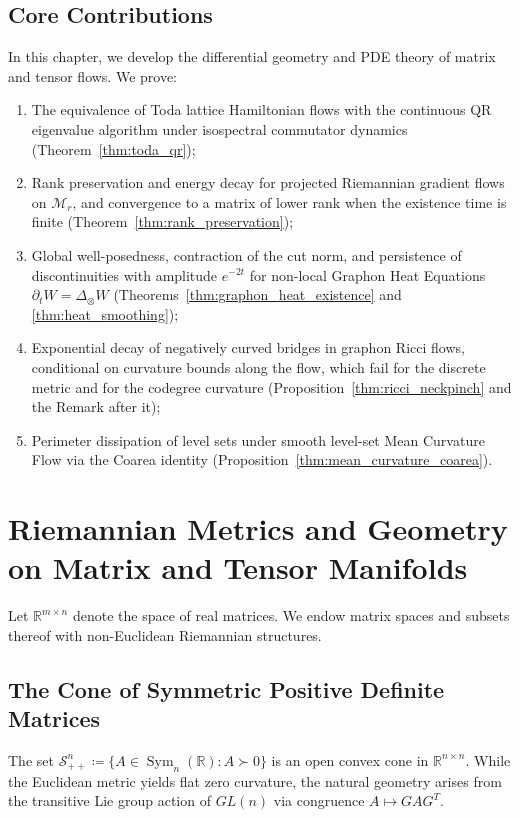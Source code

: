 \documentclass[11pt,a4paper,reqno]{amsart}
\theoremstyle{definition}
\numberwithin{equation}{section}
\providecommand{\R}{\mathbb{R}}
\providecommand{\R}{\mathbb{R}}
\begin{document}
\subsection*{Core Contributions}
In this chapter, we develop the differential geometry and PDE theory of matrix and tensor flows. We prove:
\begin{enumerate}[label=\arabic*.]
    \item The equivalence of Toda lattice Hamiltonian flows with the continuous QR eigenvalue algorithm under isospectral commutator dynamics (Theorem~\ref{thm:toda_qr});
    \item Rank preservation and energy decay for projected Riemannian gradient flows on $\mathcal{M}_r$, and convergence to a matrix of lower rank when the existence time is finite (Theorem~\ref{thm:rank_preservation});
    \item Global well-posedness, contraction of the cut norm, and persistence of discontinuities with amplitude $e^{-2t}$ for non-local Graphon Heat Equations $\partial_t W = \Delta_\otimes W$ (Theorems~\ref{thm:graphon_heat_existence} and \ref{thm:heat_smoothing});
    \item Exponential decay of negatively curved bridges in graphon Ricci flows, conditional on curvature bounds along the flow, which fail for the discrete metric and for the codegree curvature (Proposition~\ref{thm:ricci_neckpinch} and the Remark after it);
    \item Perimeter dissipation of level sets under smooth level-set Mean Curvature Flow via the Coarea identity (Proposition~\ref{thm:mean_curvature_coarea}).
\end{enumerate}

\section{Riemannian Metrics and Geometry on Matrix and Tensor Manifolds}
\label{sec:riemannian_geometry}

Let $\R^{m \times n}$ denote the space of real matrices. We endow matrix spaces and subsets thereof with non-Euclidean Riemannian structures.

\subsection{The Cone of Symmetric Positive Definite Matrices}
\label{subsec:cone_spd}
The set $\mathcal{S}_{++}^n \coloneqq \{A \in \operatorname{Sym}_n(\R) \colon A \succ 0\}$ is an open convex cone in $\R^{n \times n}$. While the Euclidean metric yields flat zero curvature, the natural geometry arises from the transitive Lie group action of $GL(n)$ via congruence $A \mapsto G A G^T$.
\end{document}
